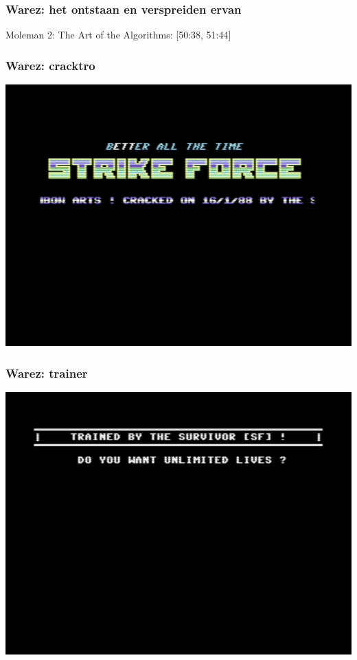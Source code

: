 \documentclass{beamer}
\begin{document}
\begin{frame}
	\frametitle{Warez: het ontstaan en verspreiden ervan}

	Moleman 2: The Art of the Algorithms: [50:38, 51:44]
\end{frame}

\begin{frame}
	\frametitle{Warez: cracktro}

	\begin{center}
	\includegraphics[width=\textwidth]{cracktro_gss.png}
	\end{center}
\end{frame}

\begin{frame}
	\frametitle{Warez: trainer}

	\begin{center}
	\includegraphics[width=\textwidth]{trainer_gss.png}
	\end{center}
\end{frame}
\end{document}
